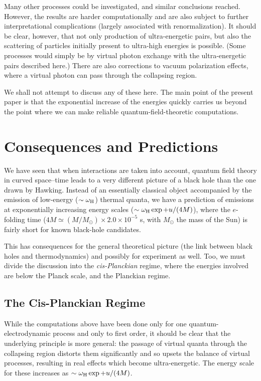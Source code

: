\documentclass[11pt]{article}
\begin{document}
Many other processes could be investigated, and similar conclusions reached. 
However, the results are harder computationally and are also subject to further
interpretational complications (largely associated with renormalization).  It
should be clear, however, that not only production of ultra-energetic pairs, but
also the scattering of particles initially present to ultra-high energies is
possible.  (Some processes would simply be by virtual photon exchange with the
ultra-energetic pairs described here.)  There are also corrections to vacuum
polarization effects, where a virtual photon can pass through the collapsing
region.

We shall not attempt to discuss any of these here.  The main point of the
present paper is that the exponential increase of the energies quickly carries
us beyond the point where we can make reliable quantum-field-theoretic
computations.

\section{Consequences and Predictions}
\label{CP}

We have seen that when interactions are taken into account, quantum field
theory in curved space--time leads to a very different picture of a black hole
than the one drawn by Hawking.  Instead of an essentially classical object
accompanied by the emission of low-energy ($\sim\omega _{\rm H}$) thermal
quanta, we have a prediction of emissions at exponentially increasing energy
scales ($\sim \omega _{\rm H}\exp +u/(4M)$), where the $e$-folding time
($4M\simeq (M/M_\odot)\times 2.0\times 10^{-5}$ s, with $M_\odot$ the mass of
the Sun) is fairly short for known black-hole candidates.

This has consequences for the general theoretical picture (the link between
black holes and thermodynamics) and possibly for experiment as well.  Too, we
must divide the discussion into the {\em cis-Planckian} regime, where the
energies involved are below the Planck scale, and the Planckian regime.

\subsection{The Cis-Planckian Regime}

While the computations above have been done only for one quantum-electrodynamic
process and only to first order, it should be clear that the underlying
principle is more general:  the passage of virtual quanta through the
collapsing region distorts them significantly and so upsets the balance of
virtual processes, resulting in real  effects which become ultra-energetic. 
The energy scale for these increases as $\sim\omega _{\rm H}\exp +u/(4M)$. 
\end{document}
